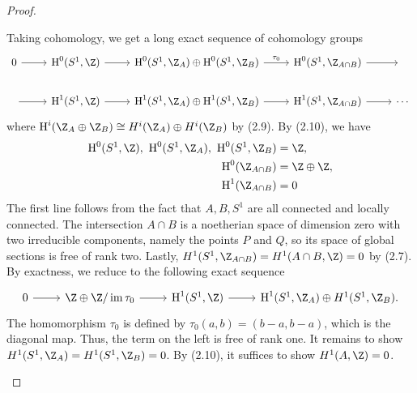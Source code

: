 \documentclass[a4paper]{article}
\begin{document}
\begin{enumerate} [label=\textbf{\arabic*.}, leftmargin=0em]
\begin{proof}
\begin{itemize} [leftmargin=0cm]
                        Taking cohomology, we get a long exact sequence of cohomology groups
                        \[ \begin{tikzcd}
                                0 \arrow[r]  & \cH^0(S^1, \Z) \arrow[r] & \cH^0(S^1, \Z_A) \oplus \cH^0(S^1, \Z_B) \arrow[r, "\tau_0"] & \cH^0(S^1, \Z_{A \cap B}) \arrow[r] & {}     \\
                                {} \arrow[r] & \cH^1(S^1, \Z) \arrow[r] & \cH^1(S^1, \Z_A) \oplus \cH^1(S^1, \Z_B) \arrow[r] & \cH^1(S^1, \Z_{A \cap B}) \arrow[r] & \cdots
                            \end{tikzcd} \]
                        where $\cH^i(\Z_A \oplus \Z_B) \cong H^i(\Z_A) \oplus H^i(\Z_B)$ by (2.9). By (2.10), we have
                        \begin{align*}
                            \cH^0(S^1, \Z), ~\cH^0(S^1, \Z_A), ~\cH^0(S^1, \Z_B) & = \Z,           \\
                            \cH^0(\Z_{A \cap B})                                 & = \Z \oplus \Z, \\
                            \cH^1(\Z_{A \cap B})                                 & = 0
                        \end{align*}
                        The first line follows from the fact that $A, B , S^1$ are all connected and locally connected. The intersection $A \cap B$ is a noetherian space of dimension zero with two irreducible components, namely the points $P$ and $Q$, so its space of global sections is free of rank two. Lastly, $H^1(S^1, \Z_{A \cap B}) = H^1(A \cap B, \Z) = 0$ by (2.7). By exactness, we reduce to the following exact sequence
                        \[ \begin{tikzcd}
                                0 \arrow[r] & \Z \oplus \Z / \im{\tau_0} \arrow[r] & \cH^1(S^1,\Z) \arrow[r] & \cH^1(S^1, \Z_A) \oplus H^1(S^1, \Z_B).
                            \end{tikzcd} \]
                        The homomorphism $\tau_0$ is defined by $\tau_0(a, b) = (b - a, b - a)$, which is the diagonal map. Thus, the term on the left is free of rank one. It remains to show $H^1(S^1, \Z_A) = H^1(S^1, \Z_B) = 0$. By (2.10), it suffices to show $H^1(A, \Z) = 0$.


\end{itemize}
\end{proof}
\end{enumerate}
\end{document}
